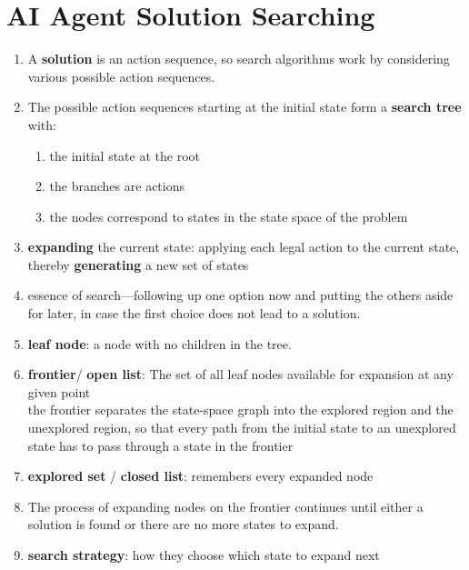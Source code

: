\chapter{AI Agent Solution Searching \cite{aci-1}}

\begin{enumerate}
    \item A \textbf{solution} is an action sequence, so search algorithms work by considering various possible action sequences. 
    
    \item The possible action sequences starting at the initial state form a \textbf{search tree} with:
    \begin{enumerate}
        \item the initial state at the root
        \item the branches are actions
        \item the nodes correspond to states in the state space of the problem
    \end{enumerate}

    \item \textbf{expanding} the current state: applying each legal action to the current state, thereby \textbf{generating} a new set of states

    \item  essence of search—following up one option now and putting the others aside for later, in case the first choice does not lead to a solution.

    \item \textbf{leaf node}: a node with no children in the tree.

    \item \textbf{frontier}/ \textbf{open list}: The set of all leaf nodes available for expansion at any given point\\
    the frontier separates the state-space graph into the explored region and the unexplored region, so that every path from the initial state to an unexplored state has to pass through a state in the frontier

    \item \textbf{explored set} / \textbf{closed list}: remembers every expanded node

    \item The process of expanding nodes on the frontier continues until either a solution is found or there are no more states to expand.

    \item \textbf{search strategy}: how they choose which state to expand next
\end{enumerate}


